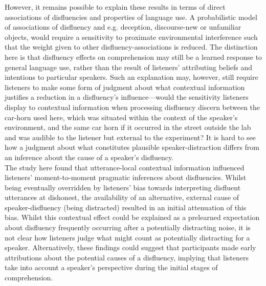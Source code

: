 \documentclass[man]{apa6}
\begin{document}
However, it remains possible to explain these results in terms of direct associations of disfluencies and properties of language use. 
A probabilistic model of associations of disfluency and e.g. deception, discourse-new or unfamiliar objects, would require a sensitivity to proximate environmental interference such that the weight given to other disfluency-associations is reduced. 
The distinction here is that disfluency effects on comprehension may still be a learned response to general language use, rather than the result of listeners' attributing beliefs and intentions to particular speakers. 
Such an explanation may, however, still require listeners to make some form of judgment about what contextual information justifies a reduction in a disfluency's influence---would the sensitivity listeners display to contextual information when processing disfluency discern between the car-horn used here, which was situated within the context of the speaker's environment, and the same car horn if it occurred in the street outside the lab and was audible to the listener but external to the experiment? 
It is hard to see how a judgment about what constitutes plausible speaker-distraction differs from an inference about the cause of a speaker's disfluency.\\

The study here found that utterance-local contextual information influenced listeners' moment-to-moment pragmatic inferences about disfluencies. 
Whilst being eventually overridden by listeners' bias towards interpreting disfluent utterances at dishonest, the availability of an alternative, external cause of speaker-disfluency (being distracted) resulted in an initial attenuation of this bias. 
Whilst this contextual effect could be explained as a prelearned expectation about disfluency frequently occurring after a potentially distracting noise, it is not clear how listeners judge what might count as potentially distracting for a speaker.
Alternatively, these findings could suggest that participants made early attributions about the potential causes of a disfluency, implying that listeners take into account a speaker's perspective during the initial stages of comprehension. 
\end{document}
